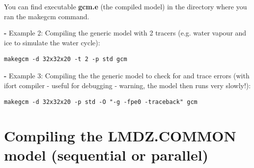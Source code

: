 \noindent
You can find executable {\bf gcm.e} (the compiled model) in the directory
where you ran the makegcm command.

{\bf -} Example 2: Compiling the generic model with 2 tracers
(e.g. water vapour and ice to simulate the water cycle):
\begin{verbatim}
makegcm -d 32x32x20 -t 2 -p std gcm
\end{verbatim}

{\bf -} Example 3:
Compiling the the generic model to check for and trace errors (with ifort compiler -
useful for debugging - warning, the model then runs very slowly!):
\begin{verbatim}
makegcm -d 32x32x20 -p std -O "-g -fpe0 -traceback" gcm
\end{verbatim}
\section{Compiling the LMDZ.COMMON model (sequential or parallel)}
\label{sc:run1_common}

